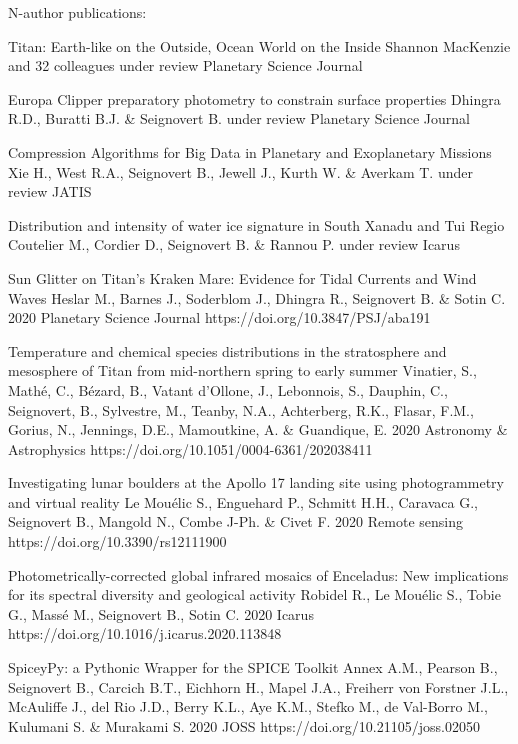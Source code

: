 \begin{cvpublications}{N-author publications:}

	{Titan: Earth-like on the Outside, Ocean World on the Inside}
	{Shannon MacKenzie and 32 colleagues}
    {under review}
	{Planetary Science Journal}
    {}

	{Europa Clipper preparatory photometry to constrain surface properties}
	{Dhingra R.D., Buratti B.J. \& Seignovert B.}
    {under review}
	{Planetary Science Journal}
    {}

	{Compression Algorithms for Big Data in Planetary and Exoplanetary Missions}
	{Xie H., West R.A., Seignovert B., Jewell J., Kurth W. \& Averkam T.}
    {under review}
	{JATIS}
    {}

	{Distribution and intensity of water ice signature in South Xanadu and Tui Regio}
	{Coutelier M., Cordier D., Seignovert B. \& Rannou P.}
    {under review}
	{Icarus}
    {}

	{Sun Glitter on Titan's Kraken Mare: Evidence for Tidal Currents and Wind Waves}
	{Heslar M., Barnes J., Soderblom J., Dhingra R., Seignovert B. \& Sotin C.}
	{2020}
    {Planetary Science Journal}
    {https://doi.org/10.3847/PSJ/aba191}

	{Temperature and chemical species distributions in the stratosphere and mesosphere of Titan from mid-northern spring to early summer}
	{Vinatier, S., Mathé, C., Bézard, B., Vatant d’Ollone, J., Lebonnois, S., Dauphin, C., Seignovert, B., Sylvestre, M., Teanby, N.A., Achterberg, R.K., Flasar, F.M., Gorius, N., Jennings, D.E., Mamoutkine, A. \& Guandique, E.}
    {2020}
	{Astronomy \& Astrophysics}
    {https://doi.org/10.1051/0004-6361/202038411}

	{Investigating lunar boulders at the Apollo 17 landing site using photogrammetry and virtual reality}
	{Le Mouélic S., Enguehard P., Schmitt H.H., Caravaca G., Seignovert B., Mangold N., Combe J-Ph. \& Civet F.}
	{2020}
    {Remote sensing}
    {https://doi.org/10.3390/rs12111900}

	{Photometrically-corrected global infrared mosaics of Enceladus: New implications for its spectral diversity and geological activity}
	{Robidel R., Le Mouélic S., Tobie  G., Massé M., Seignovert B., Sotin C.}
	{2020}
    {Icarus}
    {https://doi.org/10.1016/j.icarus.2020.113848}

	{SpiceyPy: a Pythonic Wrapper for the SPICE Toolkit}
	{Annex A.M., Pearson B., Seignovert B., Carcich B.T., Eichhorn H., Mapel J.A., Freiherr von Forstner J.L., McAuliffe J., del Rio J.D., Berry K.L., Aye K.M., Stefko M., de Val-Borro M., Kulumani S. \& Murakami S.}
	{2020}
    {JOSS}
    {https://doi.org/10.21105/joss.02050}


\end{cvpublications}
